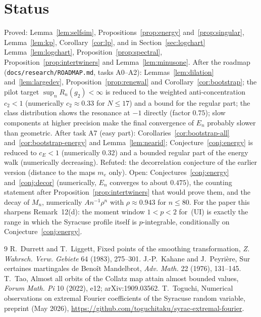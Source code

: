 \documentclass[11pt]{article}
\theoremstyle{remark}
\begin{document}
\section{Status}
Proved: Lemma~\ref{lem:selfsim}, Propositions~\ref{prop:energy} and~\ref{prop:singular}, Lemma~\ref{lem:kp}, Corollary~\ref{cor:lp}, and in Section~\ref{sec:logchart} Lemma~\ref{lem:logchart}, Proposition~\ref{prop:spectral}, Proposition~\ref{prop:intertwiners} and Lemma~\ref{lem:minusone}. After the roadmap (\texttt{docs/research/ROADMAP.md}, tasks A0--A2): Lemmas~\ref{lem:dilation} and~\ref{lem:largedev}, Proposition~\ref{prop:renewal} and Corollary~\ref{cor:bootstrap}; the pilot target $\sup_nR_n(g_2)<\infty$ is reduced to the weighted anti-concentration $c_2<1$ (numerically $c_2\approx0.33$ for $N\le17$) and a bound for the regular part; the class distribution shows the resonance at $-1$ directly (factor $0.75$); slow components at higher precision make the final convergence of $E_n$ probably slower than geometric. After task A7 (easy part): Corollaries~\ref{cor:bootstrap-all} and~\ref{cor:bootstrap-energy} and Lemma~\ref{lem:nearid}; Conjecture~\ref{conj:energy} is reduced to $c_E<1$ (numerically $0.32$) and a bounded regular part of the energy walk (numerically decreasing). Refuted: the decorrelation conjecture of the earlier version (distance to the maps $m_e$ only). Open: Conjectures~\ref{conj:energy} and~\ref{conj:decor} (numerically, $E_n$ converges to about $0.475$), the counting statement after Proposition~\ref{prop:intertwiners} that would prove them, and the decay of $M_n$, numerically $An^{-1}\rho^n$ with $\rho\approx0.943$ for $n\le80$. For the paper this sharpens Remark~12(d): the moment window $1<p<2$ for~(UI) is exactly the range in which the Syracuse profile itself is $p$-integrable, conditionally on Conjecture~\ref{conj:energy}.

\begin{thebibliography}{9}
 R.~Durrett and T.~Liggett, Fixed points of the smoothing transformation, \emph{Z. Wahrsch. Verw. Gebiete} 64 (1983), 275--301.
 J.-P.~Kahane and J.~Peyri\`ere, Sur certaines martingales de Beno\^it Mandelbrot, \emph{Adv. Math.} 22 (1976), 131--145.
 T.~Tao, Almost all orbits of the Collatz map attain almost bounded values, \emph{Forum Math. Pi} 10 (2022), e12; arXiv:1909.03562.
 T.~Toguchi, Numerical observations on extremal Fourier coefficients of the Syracuse random variable, preprint (May 2026), \url{https://github.com/toguchitaku/syrac-extremal-fourier}.
\end{thebibliography}
\end{document}
